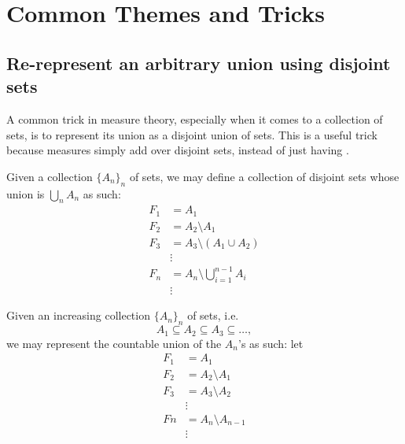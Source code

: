 \documentclass[notoc,notitlepage]{tufte-book}
\begin{document}

\chapter{Common Themes and Tricks}%
\label{chp:common_themes_and_tricks}

\section{Re-represent an arbitrary union using disjoint sets}%
\label{sec:re_represent_an_arbitrary_union_using_disjoint_sets}

A common trick in measure theory,
especially when it comes to a collection of sets,
is to represent its union as a disjoint union of sets.
This is a useful trick because measures simply add over disjoint sets,
instead of just having .

\begin{eg}\label{eg:disjoint_rep_of_countable_union}
  Given a collection $\{ A_n \}_{n}$ of sets, we may define a collection of
  disjoint sets whose union is $\bigcup_{n} A_n$ as such:
  \begin{align*}
    F_1 &= A_1 \\
    F_2 &= A_2 \setminus A_1 \\
    F_3 &= A_3 \setminus (A_1 \cup A_2) \\
        &\vdots \\
    F_n &= A_n \setminus \bigcup_{i=1}^{n-1} A_i \\
        &\vdots
  \end{align*}
\end{eg}

\begin{eg}\label{eg:disjoint_rep_of_increasing_countable_union}
  Given an increasing collection $\{ A_n \}_{n}$ of sets, i.e.
  \begin{equation*}
    A_1 \subseteq A_2 \subseteq A_3 \subseteq \hdots,
  \end{equation*}
  we may represent the countable union of the $A_n$'s as such:
  let
  \begin{align*}
    F_1 &= A_1 \\
    F_2 &= A_2 \setminus A_1 \\
    F_3 &= A_3 \setminus A_2 \\
        &\vdots \\
    Fn &= A_n \setminus A_{n-1} \\
       &\vdots
  \end{align*}
\end{eg}
\end{document}
